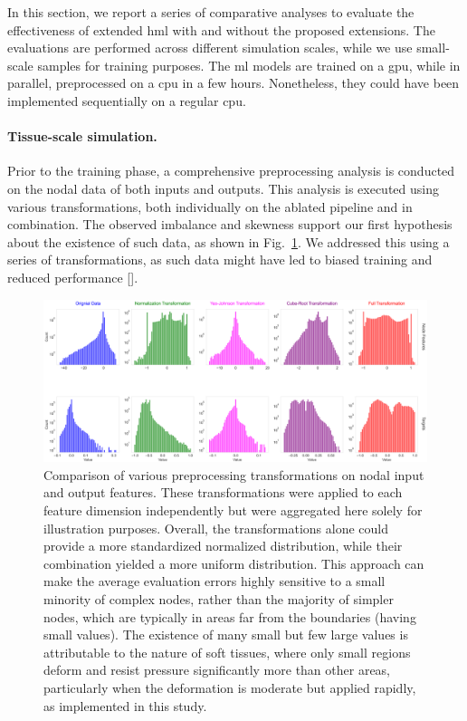 \documentclass[12pt,a4paper]{report}
\begin{document}
In this section, we report a series of comparative analyses to evaluate the effectiveness of extended \ac{hml} with and without the proposed extensions. The evaluations are performed across different simulation scales, while we use small-scale samples for training purposes. The \ac{ml} models are trained on a \ac{gpu}, while in parallel, preprocessed on a \ac{cpu} in a few hours. Nonetheless, they could have been implemented sequentially on a regular \ac{cpu}.

\paragraph{Tissue-scale simulation.} Prior to the training phase, a comprehensive preprocessing analysis is conducted on the nodal data of both inputs and outputs. This analysis is executed using various transformations, both individually on the ablated pipeline and in combination. The observed imbalance and skewness support our first hypothesis about the existence of such data, as shown in Fig.~\ref{fig:normalization}. We addressed this using a series of transformations, as such data might have led to biased training and reduced performance [\cite{rezvani2023}].
%
\begin{figure}
    \centering
    \includegraphics[width=\textheight,keepaspectratio]{normalization.png}
    \caption{Comparison of various preprocessing transformations on nodal input and output features. These transformations were applied to each feature dimension independently but were aggregated here solely for illustration purposes. Overall, the transformations alone could provide a more standardized normalized distribution, while their combination yielded a more uniform distribution. This approach can make the average evaluation errors highly sensitive to a small minority of complex nodes, rather than the majority of simpler nodes, which are typically in areas far from the boundaries (having small values). The existence of many small but few large values is attributable to the nature of soft tissues, where only small regions deform and resist pressure significantly more than other areas, particularly when the deformation is moderate but applied rapidly, as implemented in this study.}
    \label{fig:normalization}
\end{figure}
\end{document}

